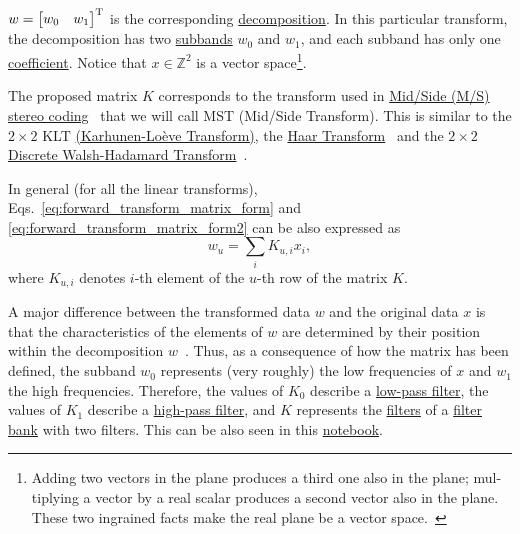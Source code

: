 $w=\begin{bmatrix} w_0 & w_1\end{bmatrix}^{\text T}$ is the
corresponding
\href{https://en.wikipedia.org/wiki/Discrete_wavelet_transform#Example_in_image_processing}{decomposition}. In
this particular transform, the decomposition has two
\href{https://en.wikipedia.org/wiki/Sub-band_coding}{subbands} $w_0$
and $w_1$, and each subband has only one
\href{https://web.stanford.edu/class/ee398a/handouts/lectures/07-TransformCoding.pdf}{coefficient}. Notice
that $x\in\mathbb{Z}^2$ is a vector space\footnote{Adding two vectors
  in the plane produces a third one also in the plane; mul- tiplying a
  vector by a real scalar produces a second vector also in the
  plane. These two ingrained facts make the real plane be a vector
  space.~\cite{vetterli2014foundations}}.

The proposed matrix $K$ corresponds to the transform used in
\href{https://en.wikipedia.org/wiki/Joint_encoding#M/S_stereo_coding}{Mid/Side
  (M/S) stereo coding}~\cite{bosi2003intro} that we will call MST
(Mid/Side Transform). This is similar to the $2\times 2$ KLT
\href{http://fourier.eng.hmc.edu/e161/lectures/klt/node3.html}{(Karhunen-Lo\`eve
  Transform)}, the
\href{http://wavelets.pybytes.com/wavelet/haar/}{Haar
  Transform}~\cite{vetterli1995wavelets} and the $2\times 2$
\href{https://en.wikipedia.org/wiki/Hadamard_transform}{Discrete
  Walsh-Hadamard Transform}~\cite{sayood2017introduction}.

In general (for all the linear transforms),
Eqs.~\ref{eq:forward_transform_matrix_form} and
\ref{eq:forward_transform_matrix_form2} can be also expressed as
\begin{equation}
  w_u = \sum_i K_{u,i}x_i,
  \label{eq:forward_transform_linear_combination_form}
\end{equation}
where $K_{u,i}$ denotes $i$-th element of the $u$-th row of the matrix
$K$.

A major difference between the transformed data $w$ and the original
data $x$ is that the characteristics of the elements of $w$ are
determined by their position within the decomposition
$w$~\cite{sayood2017introduction}. Thus, as a consequence of how the
matrix has been defined, the subband $w_0$ represents (very roughly)
the low frequencies of $x$ and $w_1$ the high frequencies. Therefore,
the values of $K_0$ describe a
\href{https://en.wikipedia.org/wiki/Low-pass_filter}{low-pass filter},
the values of $K_1$ describe a
\href{https://en.wikipedia.org/wiki/High-pass_filter}{high-pass
  filter}, and $K$ represents the
\href{https://en.wikipedia.org/wiki/Digital_filter}{filters} of a
\href{https://en.wikipedia.org/wiki/Filter_bank}{filter bank} with two
filters. This can be also seen in this
\href{https://github.com/Tecnologias-multimedia/intercom/blob/master/docs/stereo_transforms_RD.ipynb}{notebook}.

